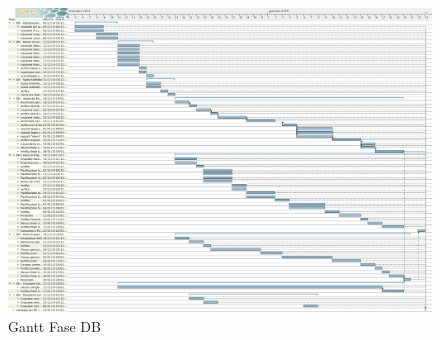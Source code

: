 	\begin{figure}[H]\centering
		\includegraphics[width=\textwidth]{PianoDiProgetto/Pics/FaseDB.png}
	\caption{Gantt Fase DB}
\end{figure}
